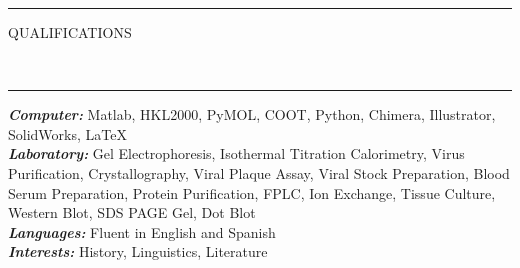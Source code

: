 \documentclass[10pt, letterpaper, oneside]{article}
\newcommand{\HRule}[2]{\textcolor{#1}{\rule{\linewidth}{#2}}}
\newcommand{\sectiontitle}[1]{\begin{minipage}{\textwidth}\HRule{black}{0.25mm}\vspace{-10pt}\begin{center}\large\MakeUppercase{#1}\end{center}\end{minipage}\vspace{-5pt}\\\HRule{light-grey}{0.15mm}\vspace{\baselineskip}}
\newenvironment{tightressection}[1]{
  \begin{minipage}{\textwidth}
  \sectiontitle{#1}}
  {\vspace{\baselineskip}\end{minipage}}
\newenvironment{rescolumn}{
  \begin{minipage}{0.5\textwidth}
    \begin{itemize}[noitemsep,nolistsep]}
  {\end{itemize}
    \end{minipage}}
\newcommand{\resitem}[1]{
    \vspace{2pt}
    \item \begin{flushleft} #1 \end{flushleft}
}
\newcommand{\boardentry}[3]{
  \begin{minipage}{\textwidth}
  \vspace{-9pt}
  \textbf{#1}\\
  \textit{#2}, \textit{#3}\\
  \vspace{0.5\baselineskip}
  \end{minipage}
}
\begin{document}
\iffalse
\begin{tightressection}{Presentations}
 \begin{rescolumn}
      \resitem{Final Design Report, 2011}
      \resitem{HHMI Science for Life Intramural Research Award, 2011}
       \resitem{HHMI Science for Life Extramural Research Award, 2012}
      \resitem{HHMI Exceptional Research Opportunities Program Scholar, 2013}
  \end{rescolumn}
\end{tightressection}
\fi





\begin{tightressection}{qualifications}
   {\sl \bf Computer:} Matlab, HKL2000, PyMOL, COOT, Python,  Chimera, Illustrator, SolidWorks, \LaTeX  \\
                {\sl \bf Laboratory:} Gel Electrophoresis, Isothermal Titration Calorimetry, Virus Purification, Crystallography, Viral Plaque Assay,
Viral Stock Preparation, Blood Serum Preparation, Protein Purification, FPLC, Ion Exchange, Tissue Culture, Western Blot, SDS PAGE Gel, Dot Blot   \\
	 {\sl \bf Languages:}  Fluent in English and Spanish \\
{\sl \bf Interests:} History, Linguistics, Literature\\
\end{tightressection}
 


\iffalse
\begin{tightressection}{Boards and Committees}
  \boardentry{Carleton University Amateur Radio Club Executive}{Operations Executive}{September 2011 --- May 2013}
  \boardentry{Canadian Association of Campus Emergency Response Teams (ACERT)}{Member of the Board of Directors}{February 2012 --- May 2013}
  \boardentry{CUSERT Executive Selection Board}{Member (2011), Chair (2012)(2013)}{Annually in April, 2011 --- 2013}
  \boardentry{Adrian D.C. Chan Award Committee}{Student Member}{October 2011 --- March 2012}
  \boardentry{ACERT Mixer Committee}{Chair}{February 2011 --- November 2011}
  \boardentry{CUSERT Executive}{External-Communications}{May 2008 --- May 2009}
\end{tightressection}
 \fi


 
\end{document}
